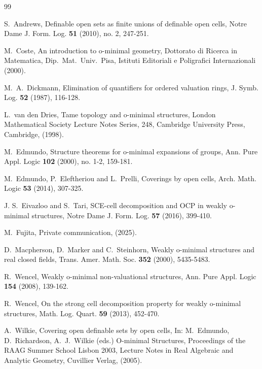 \documentclass{amsart}
\theoremstyle{definition}
\theoremstyle{plain}
\begin{document}


\begin{thebibliography}{99}
%	



S.~Andrews, Definable open sets as finite unions of definable open cells,
Notre Dame J. Form. Log. {\bf 51} (2010), no. 2, 247-251.

M.~Coste, 
An introduction to o-minimal geometry,
Dottorato di Ricerca in Matematica, Dip.\ Mat.\ Univ.\ Pisa, 
Istituti Editoriali e Poligrafici Internazionali (2000).


M.~A.~Dickmann, Elimination of quantifiers for ordered valuation rings, 
J. Symb. Log. {\bf 52} (1987), 116-128.

L.~van den Dries, Tame topology and o-minimal structures, London Mathematical Society Lecture
Notes Series, 248, Cambridge University Press, Cambridge, (1998).

M.~Edmundo,
Structure theorems for o-minimal expansions of groups,
Ann. Pure Appl. Logic {\bf 102} (2000), no. 1-2, 159-181.


M.~Edmundo, P.~Eleftheriou and L.~Prelli,
Coverings by open cells,
Arch. Math. Logic {\bf 53} (2014), 307-325.


J. S.~Eivazloo and S.~Tari,
SCE-cell decomposition and OCP in weakly o-minimal structures,
Notre Dame J. Form. Log. {\bf 57} (2016), 399-410.



M.~Fujita, Private communication, (2025).



D.~Macpherson, D.~Marker and C.~Steinhorn, Weakly o-minimal structures and real closed fields, Trans.
Amer. Math. Soc. \textbf{352} (2000), 5435-5483.






R.~Wencel,  Weakly o-minimal non-valuational structures,
Ann. Pure Appl. Logic \textbf{154} (2008), 139-162.


R.~Wencel, On the strong cell decomposition property for weakly o-minimal structures, Math. Log.
Quart. \textbf{59} (2013), 452-470.

A.~Wilkie, Covering open definable sets by open cells,
In: M.~Edmundo, D.~Richardson, A.~J.~Wilkie
(eds.) O-minimal Structures, Proceedings of the RAAG Summer School Lisbon 2003, Lecture Notes
in Real Algebraic and Analytic Geometry, Cuvillier Verlag, (2005).


\end{thebibliography}
\end{document}
